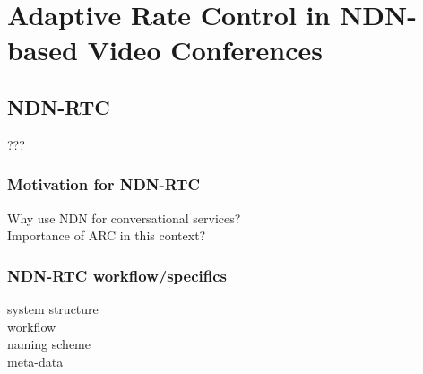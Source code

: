 \chapter{Adaptive Rate Control in NDN-based Video Conferences} \label{chapter:Topic}

\section{NDN-RTC}
???



\subsection{Motivation for NDN-RTC}
Why use NDN for conversational services? \\
Importance of ARC in this context?

\subsection{NDN-RTC workflow/specifics}
system structure \\
workflow \\
naming scheme \\
meta-data

